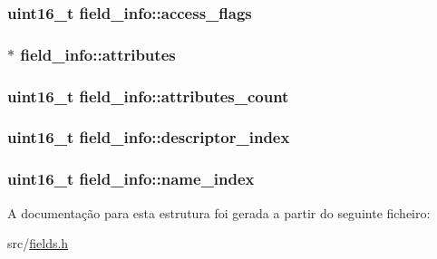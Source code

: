 \subsubsection[{\texorpdfstring{access\+\_\+flags}{access_flags}}]{\setlength{\rightskip}{0pt plus 5cm}uint16\+\_\+t field\+\_\+info\+::access\+\_\+flags}\hypertarget{structfield__info_a97bcc8f6647cee71ea02bdd4183ba1da}{}\label{structfield__info_a97bcc8f6647cee71ea02bdd4183ba1da}
\subsubsection[{\texorpdfstring{attributes}{attributes}}]{$\ast$ field\+\_\+info\+::attributes}\hypertarget{structfield__info_afdda114944ae5eaae78c237f99257108}{}\label{structfield__info_afdda114944ae5eaae78c237f99257108}
\subsubsection[{\texorpdfstring{attributes\+\_\+count}{attributes_count}}]{\setlength{\rightskip}{0pt plus 5cm}uint16\+\_\+t field\+\_\+info\+::attributes\+\_\+count}\hypertarget{structfield__info_a26aebef0abc97afef9e9a34701e6b550}{}\label{structfield__info_a26aebef0abc97afef9e9a34701e6b550}
\subsubsection[{\texorpdfstring{descriptor\+\_\+index}{descriptor_index}}]{\setlength{\rightskip}{0pt plus 5cm}uint16\+\_\+t field\+\_\+info\+::descriptor\+\_\+index}\hypertarget{structfield__info_a56345eae0135047540b60ca34c91eb46}{}\label{structfield__info_a56345eae0135047540b60ca34c91eb46}
\subsubsection[{\texorpdfstring{name\+\_\+index}{name_index}}]{\setlength{\rightskip}{0pt plus 5cm}uint16\+\_\+t field\+\_\+info\+::name\+\_\+index}\hypertarget{structfield__info_a3041f6a85347269c5253f7d377384b06}{}\label{structfield__info_a3041f6a85347269c5253f7d377384b06}


A documentação para esta estrutura foi gerada a partir do seguinte ficheiro\+:\begin{DoxyCompactItemize}
\item 
src/\hyperlink{fields_8h}{fields.\+h}\end{DoxyCompactItemize}
